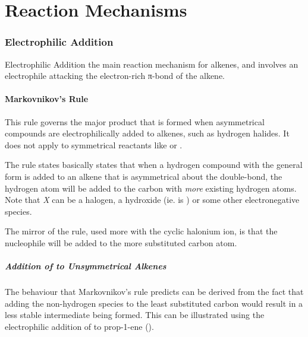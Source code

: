
\pagebreak
\hypertarget{AppendixReactionMechanisms}{}
\part{Reaction Mechanisms}

	\hypertarget{AppendixElectrophilicAddition}{}
	\section{Electrophilic Addition}

		Electrophilic Addition the main reaction mechanism for alkenes, and involves an electrophile attacking the electron-rich
		π-bond of the alkene.


		\subsection{Markovnikov's Rule}

			This rule governs the major product that is formed when asymmetrical compounds are electrophilically added to alkenes,
			such as hydrogen halides. It does not apply to symmetrical reactants like  or .

			The rule states basically states that when a hydrogen compound with the general form  is added to an
			alkene that is asymmetrical about the double-bond, the hydrogen atom will be added to the carbon with \textit{more}
			existing hydrogen atoms. Note that \textit{X} can be a halogen, a hydroxide (ie.  is ) or some other
			electronegative species.

			The mirror of the rule, used more with the cyclic halonium ion, is that the nucleophile will be added to the more substituted
			carbon atom.


			\pagebreak
			\hypertarget{AppendixMarkovnikovsRuleIllustration}{}
			\subsubsection{Addition of  to Unsymmetrical Alkenes}

				The behaviour that Markovnikov's rule predicts can be derived from the fact that adding the non-hydrogen species to the least substituted carbon would
				result in a less stable intermediate being formed. This can be illustrated using the electrophilic addition of
				 to prop-1-ene ().


